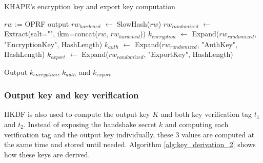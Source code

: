 \documentclass[../report.tex]{subfiles}
\begin{document}
\begin{algorithm}
\caption{KHAPE's encryption key and export key computation}
\label{alg:key_derivation_1}

\begin{algorithmic}
\Require $rw$ := OPRF output
\State $rw_{hardened}$ $\gets$ SlowHash($rw$)
\State $rw_{randomized}$ $\gets$ Extract(salt="", ikm=concat($rw$, $rw_{hardened}$))
\State $k_{encryption}$ $\gets$ Expand($rw_{randomized}$, "EncryptionKey", HashLength)
\State $k_{auth}$ $\gets$ Expand($rw_{randomized}$, "AuthKey", HashLength)
\State $k_{export}$ $\gets$ Expand($rw_{randomized}$, "ExportKey", HashLength)

\State Output $k_{encryption}$, $k_{auth}$ and $k_{export}$
\end{algorithmic}
\end{algorithm}



% 
% 


\subsubsection{Output key and key verification}

HKDF is also used to compute the output key $K$ and both key verification tag $t_1$ and $t_2$.
Instead of exposing the handshake secret $k$ and computing each verification tag and the output key individually, these 3 values are computed at the same time and stored until needed.
Algorithm \ref{alg:key_derivation_2} shows how these keys are derived.
\end{document}
